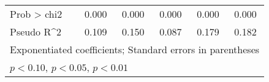 \begin{table}[htbp]
\begin{tabular}{l*{5}{c}}
Prob > chi2         &       0.000         &       0.000         &       0.000         &       0.000         &       0.000         \\
Pseudo R^2          &       0.109         &       0.150         &       0.087         &       0.179         &       0.182         \\
\hline\hline
\multicolumn{6}{l}{\footnotesize Exponentiated coefficients; Standard errors in parentheses}\\
\multicolumn{6}{l}{\footnotesize \sym{*} \(p<0.10\), \sym{**} \(p<0.05\), \sym{***} \(p<0.01\)}\\
\end{tabular}
\end{table}
